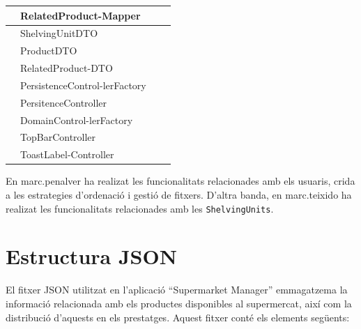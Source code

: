 \documentclass[a4paper,12pt]{report}
\begin{document}
\begin{table}[H]
\begin{tabularx}{\textwidth}{|X|X|X|X|}
			\hline
			                    & RelatedProduct-\newline Mapper&                  &                 \\
			\hline
			                    & ShelvingUnitDTO &                 &                 \\
			\hline
			                    & ProductDTO &                 &                 \\
			\hline
			                    & RelatedProduct-\newline DTO &                 &                 \\
			\hline
			                 & PersistenceControl-\newline lerFactory &                   &                 \\
			\hline
			                 & PersitenceController &                   &                 \\
			\hline
			                 & DomainControl-\newline  lerFactory &                  &                 \\
			\hline
			                 &TopBarController &                  &                 \\
			\hline
			                 &ToastLabel-\newline Controller &                  &                 \\
			\hline
		\end{tabularx}
	\end{table}

En marc.penalver ha realizat les funcionalitats relacionades amb els usuaris, crida a les estrategies d'ordenació i gestió de fitxers. D'altra banda, en marc.teixido ha realizat les funcionalitats relacionades amb les \texttt{ShelvingUnits}.

\section{Estructura JSON}

El fitxer JSON utilitzat en l'aplicació ``Supermarket Manager'' emmagatzema la informació relacionada amb els productes disponibles al supermercat, així com la distribució d'aquests en els prestatges. Aquest fitxer conté els elements següents:
\end{document}
